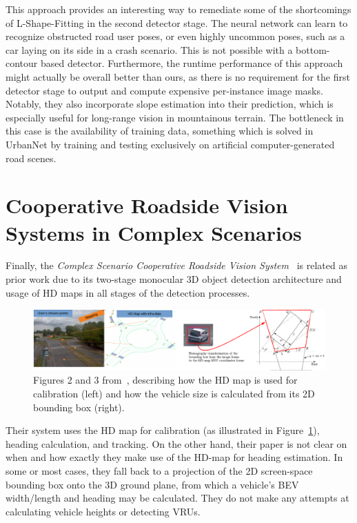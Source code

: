 This approach provides an interesting way to remediate some of the shortcomings of L-Shape-Fitting in the second detector stage.
The neural network can learn to recognize obstructed road user poses, or even highly uncommon poses, such as a car laying on its side in a crash scenario.
This is not possible with a bottom-contour based detector.
Furthermore, the runtime performance of this approach might actually be overall better than ours, as there is no requirement for the first detector stage to output and compute expensive per-instance image masks.
Notably, they also incorporate slope estimation into their prediction, which is especially useful for long-range vision in mountainous terrain.
The bottleneck in this case is the availability of training data, something which is solved in UrbanNet by training and testing exclusively on artificial computer-generated road scenes.

\section{Cooperative Roadside Vision Systems in Complex Scenarios}
\label{sec:related-crvis}

Finally, the \textit{Complex Scenario Cooperative Roadside Vision System}~\cite{masi2021augmented} is related as prior work due to its two-stage monocular 3D object detection architecture and usage of HD maps in all stages of the detection processes.

\begin{figure}[htb]
    \centering
    \includegraphics[width=1.0\linewidth]{figures/coop_roadside_vis_aug_perception_fig}
    \caption{Figures 2 and 3 from~\cite{masi2021augmented}, describing how the HD map is used for calibration (left) and how the vehicle size is calculated from its 2D bounding box (right).}
    \label{fig:related-crvis}
\end{figure}

Their system uses the HD map for calibration (as illustrated in Figure~\ref{fig:related-crvis}), heading calculation, and tracking.
On the other hand, their paper is not clear on when and how exactly they make use of the HD-map for heading estimation.
In some or most cases, they fall back to a projection of the 2D screen-space bounding box onto the 3D ground plane, from which a vehicle's BEV width/length and heading may be calculated.
They do not make any attempts at calculating vehicle heights or detecting VRUs.

